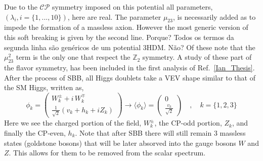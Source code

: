 Due to the $\mathcal{CP}$ symmetry imposed on this potential all parameters, $(\lambda_i,i=\{1,...,10\})$, here are real.
%
The parameter $\mu_{23}$, is necessarily added as to impede the formation of a massless axion. 
%
However the most generic version of this soft breaking is given by the second line. {\color{red} Porque?
Todos os termos da segunda linha são genéricos de um potential 3HDM. Não?} 
%
Of these note that the $\mu^2_{23}$ term is the only one that respect the $\mathbb{Z}_2$ symmetry. 
%
A study of these part of the flavor symmetry, has been included in the first analysis of Ref.~\ref{Ian_Thesis}.
%
After the process of SBB, all Higgs doublets take a VEV shape similar to that of the SM Higgs, written as, 
%
\begin{equation}
\phi_k = 
\begin{pmatrix}
W_k^\pm + i \, W_k^\mp \\ 
\frac{1}{\sqrt{2}}\left( v_k + h_k + i Z_k \right)
\end{pmatrix}  \rightarrow \langle \phi_k \rangle = \begin{pmatrix}
0 \\ 
\frac{v_k}{\sqrt{2}}
\end{pmatrix} \quad , \quad k=\{ 1,2,3\} 
\label{eq:3HDM_Higgs_Field_VEV}
\end{equation} 
%
Here we see the charged portion of the field, $W_k^\pm$, the CP-odd portion, $Z_k$, and finally the CP-even, $h_k$. 
%
Note that after SBB there will still remain 3 massless states (goldstone bosons) that will be later absorved into the gauge bosons $W$ and $Z$. This allows for them to be removed from the scalar spectrum.

